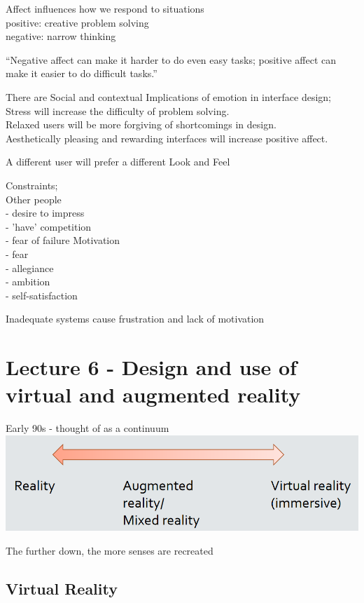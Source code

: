 \documentclass[]{project_plan}
\begin{document}
Affect influences how we respond to situations\\
positive: creative problem solving\\
negative: narrow thinking

“Negative affect can make it harder to do even easy tasks; positive affect can make it easier to do difficult tasks.”

There are Social and contextual Implications of emotion in interface design;\\
Stress will increase the difficulty of problem solving.\\
Relaxed users will be more forgiving of shortcomings in design.\\
Aesthetically pleasing and rewarding interfaces will increase positive affect.

A different user will prefer a different Look and Feel

Constraints;\\
Other people\\
- desire to impress\\
- 'have' competition\\
- fear of failure
Motivation\\
- fear\\
- allegiance\\
- ambition\\
- self-satisfaction

Inadequate systems cause frustration and lack of motivation

\chapter{Lecture 6 - Design and use of virtual and augmented reality}

Early 90s - thought of as a continuum\\
\includegraphics[width=\linewidth]{vr_continuum.png}

The further down, the more senses are recreated

\section{Virtual Reality}
\end{document}
